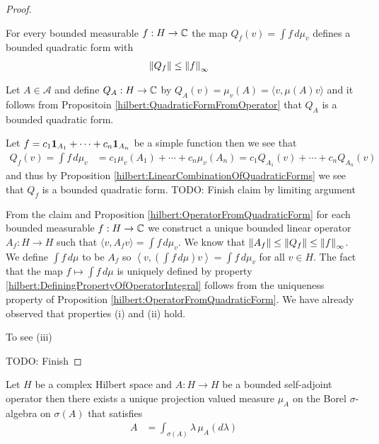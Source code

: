 \begin{proof}

\begin{clm}For every bounded measurable $f : H \to \mathbb{C}$ the map $Q_f(v) = \int f \, d\mu_v$ defines a bounded quadratic form with 
\begin{align*}
\left \lVert Q_f \right \rVert &\leq \left \lVert f \right \rVert_\infty
\end{align*}
\end{clm}
Let $A \in \mathcal{A}$ and define $Q_A : H \to \mathbb{C}$ by $Q_A(v) = \mu_v(A) = \langle v , \mu(A) v \rangle$ and it follows from Propositoin \ref{hilbert:QuadraticFormFromOperator} that $Q_A$ is a bounded quadratic form.

Let $f = c_1 \textbf{1}_{A_1} + \dotsb + c_n \textbf{1}_{A_n}$ be a simple function then we see that 
\begin{align*}
Q_f(v) = \int f \, d\mu_v &= c_1 \mu_v(A_1) +  \dotsb + c_n \mu_v(A_n) =  c_1 Q_{A_1}(v) +  \dotsb + c_n Q_{A_n}(v) 
\end{align*}
and thus by Proposition \ref{hilbert:LinearCombinationOfQuadraticForms} we see that $Q_f$ is a bounded quadratic form.  TODO: Finish claim by limiting argument

From the claim and Proposition  \ref{hilbert:OperatorFromQuadraticForm} for each bounded measurable $f : H \to \mathbb{C}$ we construct a unique bounded linear operator $A_f : H \to H$ such that
$\langle v, A_f v \rangle = \int f \, d \mu_v$.  We know that $\left \lVert A_f \right \rVert \leq \left \lVert Q_f \right \rVert \leq \left \lVert f \right \rVert_\infty$.  We define $\int f \, d\mu$ to be $A_f$ so $\left \langle v, \left(\int f \, d\mu \right) v \right \rangle = \int f \, d\mu_v$ for all $v \in H$.  The fact that the map $f \mapsto \int f \, d\mu$ is uniquely defined by property \eqref{hilbert:DefiningPropertyOfOperatorIntegral} follows from the uniqueness property of Proposition  \ref{hilbert:OperatorFromQuadraticForm}.  We have already observed that properties (i) and (ii) hold.  

To see (iii)

TODO: Finish
\end{proof}

\begin{thm}Let $H$ be a complex Hilbert space and $A : H \to H$ be a bounded self-adjoint operator then there exists a unique projection valued measure $\mu_A$ on the Borel $\sigma$-algebra on $\sigma(A)$ that satisfies
\begin{align*}
A &= \int_{\sigma(A)} \lambda  \, \mu_A(d\lambda)
\end{align*}
\end{thm}


